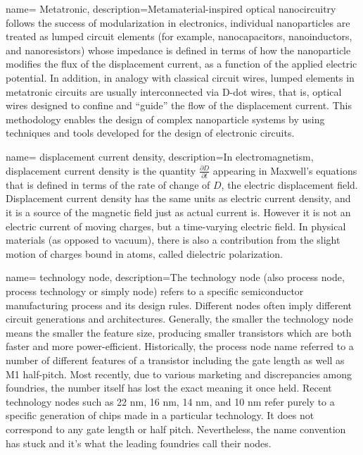 {
        name= Metatronic,
        description={Metamaterial-inspired optical nanocircuitry follows the success of modularization in electronics, individual nanoparticles are treated as lumped circuit elements (for example, nanocapacitors, nanoinductors, and nanoresistors) whose impedance is defined in terms of how the nanoparticle modifies the flux of the displacement current, as a function of the applied electric potential. In addition, in analogy with classical circuit wires, lumped elements in metatronic circuits are usually interconnected via D-dot wires, that is, optical wires designed to confine and “guide” the flow of the displacement current. This methodology enables the design of complex nanoparticle systems by using techniques and tools developed for the design of electronic circuits.\cite{li2016waveguide}}
}

{
    name= displacement current density,
    description={In electromagnetism, displacement current density is the quantity $\frac{\partial D}{\partial t}$ appearing in Maxwell's equations that is defined in terms of the rate of change of $D$, the electric displacement field. Displacement current density has the same units as electric current density, and it is a source of the magnetic field just as actual current is. However it is not an electric current of moving charges, but a time-varying electric field. In physical materials (as opposed to vacuum), there is also a contribution from the slight motion of charges bound in atoms, called dielectric polarization.}
}


{
        name= technology node,
        description={The technology node (also process node, process technology or simply node) refers to a specific semiconductor manufacturing process and its design rules. Different nodes often imply different circuit generations and architectures. Generally, the smaller the technology node means the smaller the feature size, producing smaller transistors which are both faster and more power-efficient. Historically, the process node name referred to a number of different features of a transistor including the gate length as well as M1 half-pitch. Most recently, due to various marketing and discrepancies among foundries, the number itself has lost the exact meaning it once held. Recent technology nodes such as 22 nm, 16 nm, 14 nm, and 10 nm refer purely to a specific generation of chips made in a particular technology. It does not correspond to any gate length or half pitch. Nevertheless, the name convention has stuck and it's what the leading foundries call their nodes.}
}

